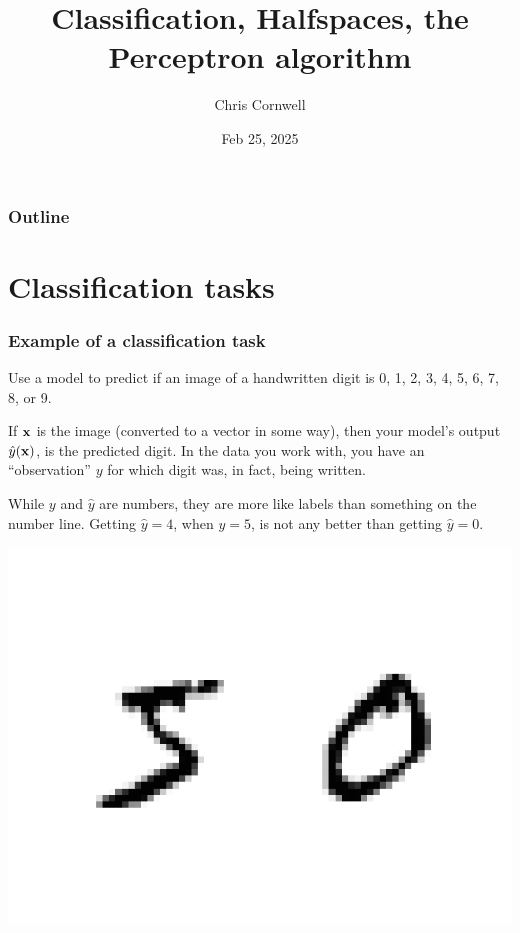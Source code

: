 \documentclass{beamer}
\author{Chris Cornwell}
\date{Feb 25, 2025}
\title{Classification, Halfspaces, the Perceptron algorithm}
\theoremstyle{example}
\begin{document}
\begin{frame}
\titlepage
\end{frame}

\begin{frame}
\frametitle{Outline}
\tableofcontents
\end{frame}

\section{Classification tasks}

\begin{frame}
\frametitle{Example of a classification task}
Use a model to predict if an image of a handwritten digit is 0, 1, 2, 3, 4, 5, 6, 7, 8, or 9. 

If ${\bf x}$ is the image (converted to a vector in some way), then your model's output $\hat{y}({\bf x})$, is the predicted digit. In the data you work with, you have an ``observation'' $y$ for which digit was, in fact, being written. 

\pause 
While $y$ and $\hat{y}$ are numbers, they are more like labels than something on the number line. Getting $\hat{y} = 4$, when $y = 5$, is not any better than getting $\hat{y} = 0$.

\centering
\includegraphics[height=0.25\textheight]{../../Images/50.png}
\end{frame}
\end{document}
